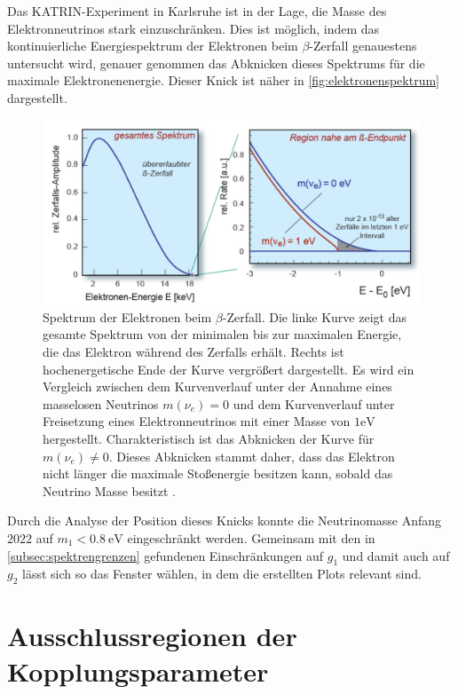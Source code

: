 Das KATRIN-Experiment in Karlsruhe ist in der Lage, die Masse des Elektronneutrinos stark einzuschränken.
Dies ist möglich, indem das kontinuierliche Energiespektrum der Elektronen beim $\beta$-Zerfall genauestens untersucht wird, genauer genommen das Abknicken dieses Spektrums für die maximale Elektronenenergie.
Dieser Knick ist näher in \autoref{fig:elektronenspektrum} dargestellt.
\begin{figure}[H]
    \centering
    \includegraphics[width=.5\textwidth]{figures/Elektronenspektrum.pdf}
    \caption{Spektrum der Elektronen beim $\beta$-Zerfall. Die linke Kurve zeigt das gesamte Spektrum von der minimalen bis zur maximalen Energie, die das Elektron während des Zerfalls erhält. Rechts
            ist hochenergetische Ende der Kurve vergrößert dargestellt. Es wird ein Vergleich zwischen dem Kurvenverlauf unter der Annahme eines masselosen Neutrinos $m(\nu_e) = 0$ und dem Kurvenverlauf unter Freisetzung
            eines Elektronneutrinos mit einer Masse von $1 \si{\eV}$ hergestellt. Charakteristisch ist das Abknicken der Kurve für $m(\nu_e) \neq 0$. Dieses Abknicken stammt daher, dass das Elektron nicht länger
            die maximale Stoßenergie besitzen kann, sobald das Neutrino Masse besitzt \cite{elektronenspektrum}.}
    \label{fig:elektronenspektrum}
\end{figure}
Durch die Analyse der Position dieses Knicks konnte die Neutrinomasse Anfang $2022$ auf $m_1 < \SI{0.8}{\eV}$ \cite{KATRINneutrinogrenze} eingeschränkt werden.
Gemeinsam mit den in \autoref{subsec:spektrengrenzen} gefundenen Einschränkungen auf $g_1$ und damit auch auf $g_2$ lässt sich so das Fenster wählen, in dem die erstellten Plots relevant sind.



\section{Ausschlussregionen der Kopplungsparameter}

